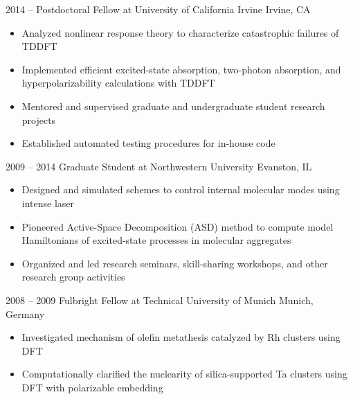\documentclass[resume]{parker-cv}
\begin{document}
\begin{entrylist}
  \entry
  {2014 -- }
  {Postdoctoral Fellow at University of California Irvine}
  {Irvine, CA}
  { \vspace{-1em}
    \begin{itemize}[leftmargin=*,nosep]
      \item Analyzed nonlinear response theory to characterize catastrophic failures of TDDFT
      \item Implemented efficient excited-state absorption, two-photon absorption,
        and hyperpolarizability calculations with TDDFT
      \item Mentored and supervised graduate and undergraduate student research projects
      \item Established automated testing procedures for in-house code
    \end{itemize}
  }

  \entry
  {2009 -- 2014}
  {Graduate Student at Northwestern University}
  {Evanston, IL}
  { \vspace{-1em}
    \begin{itemize}[leftmargin=*,nosep]
      \item Designed and simulated schemes to control internal molecular modes
        using intense laser
      \item Pioneered Active-Space Decomposition (ASD) method to compute model Hamiltonians
        of excited-state processes in molecular aggregates
      \item Organized and led research seminars, skill-sharing workshops, and other research group activities
    \end{itemize}
  }

  \entry
  {2008 -- 2009}
  {Fulbright Fellow at Technical University of Munich}
  {Munich, Germany}
  { \vspace{-1em}
    \begin{itemize}[leftmargin=*,nosep]
      \item Investigated mechanism of olefin metathesis catalyzed by Rh clusters using DFT
      \item Computationally clarified the nuclearity of silica-supported Ta clusters using
        DFT with polarizable embedding
    \end{itemize}
  }

\end{entrylist}

\end{document}
